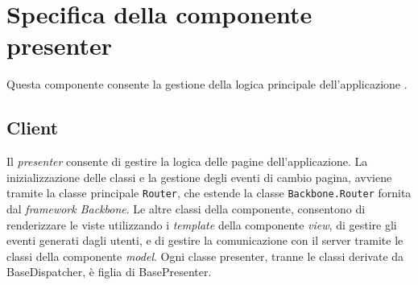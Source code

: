 \section{Specifica della componente presenter}
Questa componente consente la gestione della logica principale dell'applicazione \progetto{} .

\subsection{Client}

Il \textit{presenter} consente di gestire la logica delle pagine dell'applicazione.
La inizializzazione delle classi e la gestione degli eventi di cambio pagina, avviene tramite la classe principale \texttt{Router}, che estende la classe \texttt{Backbone.Router} fornita dal \textit{framework Backbone}.
Le altre classi della componente, consentono di renderizzare le viste utilizzando i \textit{template} della componente \textit{view}, di gestire gli eventi generati dagli utenti, e di gestire la comunicazione con il server tramite le classi della componente \textit{model}.
Ogni classe presenter, tranne le classi derivate da BaseDispatcher, è figlia di BasePresenter.

